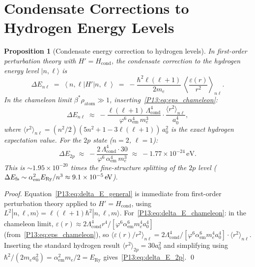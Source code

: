 \documentclass[11pt,a4paper]{article}
\newtheorem{proposition}[theorem]{Proposition}
\theoremstyle{definition}
\theoremstyle{remark}
\newcommand{\vp}{\varphi}
\newcommand{\bst}{\beta^{*}}
\newcommand{\Lcond}{\Lambda_{\mathrm{cond}}}
\newcommand{\ERy}{E_{\mathrm{Ry}}}
\newcommand{\aem}{\alpha_{\mathrm{em}}}
\newcommand{\Hcond}{H_{\mathrm{cond}}}
\newcommand{\rhoa}{\rho_{\mathrm{atom}}}
\newcommand{\epsr}{\varepsilon(r)}
\begin{document}
\section{Condensate Corrections to Hydrogen Energy Levels}
\label{P13:sec:energy_correction}

\begin{proposition}[Condensate energy correction to hydrogen levels]
\label{P13:prop:energy_correction}
In first-order perturbation theory with $H' = \Hcond$,
the condensate correction to the hydrogen energy level $|n,\ell\rangle$ is
\begin{equation}
  \Delta E_{n\ell}
  \;=\; \left\langle n,\ell\left|H'\right|n,\ell\right\rangle
  \;=\; -\frac{\hbar^2\ell(\ell+1)}{2m_e}\,
        \left\langle\frac{\epsr}{r^2}\right\rangle_{n\ell}.
  \label{P13:eq:delta_E_general}
\end{equation}
In the chameleon limit $\bst\rhoa\gg1$, inserting~\eqref{P13:eq:eps_chameleon}:
\begin{equation}
  \Delta E_{n\ell}
  \;\approx\; -\frac{\ell(\ell+1)\,\Lcond^4}{\vp^6\,\aem^4\,m_e^3}
              \cdot\frac{\langle r^2\rangle_{n\ell}}{a_0^4},
  \label{P13:eq:delta_E_chameleon}
\end{equation}
where $\langle r^2\rangle_{n\ell} = (n^2/2)(5n^2+1-3\ell(\ell+1))\,a_0^2$
is the exact hydrogen expectation value.
For the $2p$ state ($n=2$, $\ell=1$):
\begin{equation}
  \boxed{\Delta E_{2p}
  \;\approx\; -\frac{2\,\Lcond^4\cdot30}{\vp^6\,\aem^4\,m_e^3}
  \;\approx\; -1.77\times10^{-24}\,\mathrm{eV}.}
  \label{P13:eq:delta_E_2p}
\end{equation}
This is $\sim1.95\times10^{-20}$ times the fine-structure
splitting of the $2p$ level
($\Delta E_{\rm fs}\sim\aem^2\ERy/n^3\approx9.1\times10^{-5}\,\mathrm{eV}$).
\end{proposition}

\begin{proof}
Equation~\eqref{P13:eq:delta_E_general} is immediate from first-order
perturbation theory applied to $H'=\Hcond$,
using $L^2|n,\ell,m\rangle = \ell(\ell+1)\hbar^2|n,\ell,m\rangle$.
For~\eqref{P13:eq:delta_E_chameleon}: in the chameleon limit,
$\epsr \approx 2\Lcond^4 r^4/[\vp^6\aem^6 m_e^4 a_0^4]$
(from~\eqref{P13:eq:eps_chameleon}), so
$\langle\epsr/r^2\rangle_{n\ell}
= 2\Lcond^4/[\vp^6\aem^6 m_e^4 a_0^4]\cdot\langle r^2\rangle_{n\ell}$.
Inserting the standard hydrogen result
$\langle r^2\rangle_{2p} = 30a_0^2$ and simplifying
using $\hbar^2/(2m_e a_0^2) = \aem^2 m_e/2 = \ERy$
gives~\eqref{P13:eq:delta_E_2p}.
\qed
\end{proof}
\end{document}
